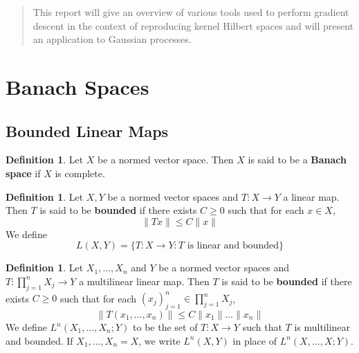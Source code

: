 \documentclass[twoside]{article}
\theoremstyle{definition}
\newtheorem{defn}[definition]{Definition}
\theoremstyle{definition}
\begin{document}
%

%


\begin{abstract}
  This report will give an overview of various tools used to perform gradient descent in the context of reproducing kernel Hilbert spaces and will present an application to Gaussian processes. 
\end{abstract}

\section{Banach Spaces}
\subsection{Bounded Linear Maps}
\begin{defn}
		Let $X$ be a normed vector space. Then $X$ is said to be a \textbf{Banach space} if $X$ is complete.  
	\end{defn}
	
	\begin{defn}
		Let $X,Y$ be a normed vector spaces and $T:X \rightarrow Y$ a linear map. Then $T$ is said to be \textbf{bounded} if there exists $C \geq 0$ such that for each $x \in X$, $$\|Tx \|\leq C \|x \|$$ We define $$L(X,Y) = \{T:X \rightarrow Y: T \text{ is linear and bounded}\}$$
	\end{defn}
	
	\begin{defn}
		Let $X_1, \dots, X_n$ and $Y$ be a normed vector spaces and $T:\prod\limits_{j=1}^n X_j \rightarrow Y$ a multilinear linear map. Then $T$ is said to be \textbf{bounded} if there exists $C \geq 0$ such that for each $(x_j)_{j=1}^n \in \prod\limits_{j=1}^n X_j$, $$\|T(x_1, \dots, x_n) \|\leq C \|x_1 \| \dots \|x_n\|$$ 
		We define $L^n(X_1, \dots, X_n; Y)$ to be the set of $T:X \rightarrow Y$ such that $T$ is multilinear and bounded. If $X_1, \dots, X_n = X$, we write $L^n(X,Y)$ in place of  $L^n(X, \dots, X; Y)$.
	\end{defn}
	
\end{document}
